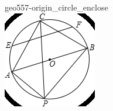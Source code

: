 \documentclass[12pt]{article}
\begin{document}
\begin{center}
\begin{minipage}{0.32\textwidth}
\end{minipage}
\hfill\begin{minipage}{0.32\textwidth}\centering
geo557-origin\_circle\_enclose\\
\includegraphics[width=0.95\linewidth]{out_rommath_origin/items/geo557-origin/assets/figure_circle.png}
\end{minipage}
\par
\end{center}
\bigskip
\end{document}
